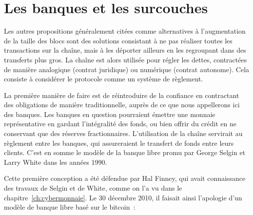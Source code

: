 
\section*{Les banques et les surcouches}

Les autres propositions généralement citées comme alternatives à l'augmentation de la taille des blocs sont des solutions consistant à ne pas réaliser toutes les transactions sur la chaîne, mais à les déporter ailleurs en les regroupant dans des transferts plus gros. La chaîne est alors utilisée pour régler les dettes, contractées de manière analogique (contrat juridique) ou numérique (contrat autonome). Cela consiste à considérer le protocole comme un système de règlement.


La première manière de faire est de réintroduire de la confiance en contractant des obligations de manière traditionnelle, auprès de ce que nous appellerons ici des banques. Les banques en question pourraient émettre une monnaie représentative en gardant l'intégralité des fonds, ou bien offrir du crédit en ne conservant que des réserves fractionnaires. L'utilisation de la chaîne servirait au règlement entre les banques, qui assureraient le transfert de fonds entre leurs clients. C'est en somme le modèle de la banque libre promu par George Selgin et Larry White dans les années 1990.

Cette première conception a été défendue par Hal Finney, qui avait connaissance des travaux de Selgin et de White, comme on l'a vu dans le chapitre~\ref{ch:cybermonnaie}. Le 30 décembre 2010, il faisait ainsi l'apologie d'un modèle de banque libre basé sur le bitcoin~:

